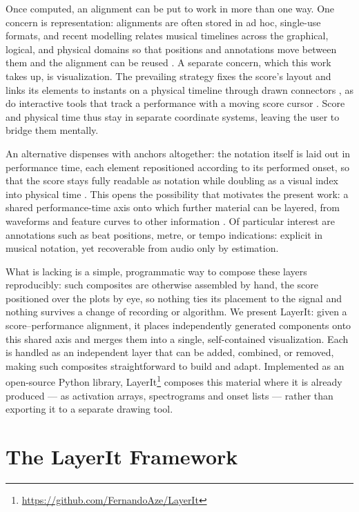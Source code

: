 \documentclass{article}
\begin{document}
Once computed, an alignment can be put to work in more than one way. One concern is representation: alignments are often stored in ad hoc, single-use formats, and recent modelling relates musical timelines across the graphical, logical, and physical domains so that positions and annotations move between them and the alignment can be reused \cite{hentschel2026TimeAlignModelling}. A separate concern, which this work takes up, is visualization. The prevailing strategy fixes the score's layout and links its elements to instants on a physical timeline through drawn connectors \cite{thomas2012LinkingSheetMusic}, as do interactive tools that track a performance with a moving score cursor \cite{jiang2025PianoPrecisionAdvancing}. Score and physical time thus stay in separate coordinate systems, leaving the user to bridge them mentally.

An alternative dispenses with anchors altogether: the notation itself is laid out in performance time, each element repositioned according to its performed onset, so that the score stays fully readable as notation while doubling as a visual index into physical time \cite{goebl2025LetsScoreWarpAgain}. This opens the possibility that motivates the present work: a shared performance-time axis onto which further material can be layered, from waveforms and feature curves to other information \cite{pinto2020ShiftIfYou}. Of particular interest are annotations such as beat positions, metre, or tempo indications: explicit in musical notation, yet recoverable from audio only by estimation.

What is lacking is a simple, programmatic way to compose these layers reproducibly: such composites are otherwise assembled by hand, the score positioned over the plots by eye, so nothing ties its placement to the signal and nothing survives a change of recording or algorithm. 
We present LayerIt: given a score--performance alignment, it places independently generated components onto this shared axis and merges them into a single, self-contained visualization. Each is handled as an independent layer that can be added, combined, or removed, making such composites straightforward to build and adapt. Implemented as an open-source Python library, LayerIt\footnote{\url{https://github.com/FernandoAze/LayerIt}} composes this material where it is already produced — as activation arrays, spectrograms and onset lists — rather than exporting it to a separate drawing tool.
%
\section{The LayerIt Framework}\label{sec:framework}
\end{document}
